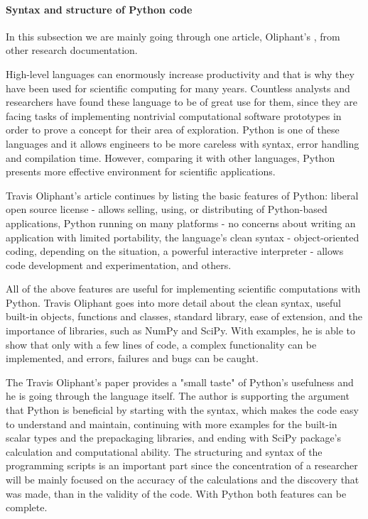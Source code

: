 \paragraph{Syntax and structure of Python code} 
\label{syntax}

In this subsection we are mainly going through one article, Oliphant's \cite{oliphant2007python}, from other research documentation. 

High-level languages can enormously increase productivity and that is why they have been used for scientific computing for many years. Countless analysts and researchers have found these language to be of great use for them, since they are facing tasks of implementing nontrivial computational software prototypes in order to prove a concept for their area of exploration. Python is one of these languages and it allows engineers to be more careless with syntax, error handling and compilation time. However, comparing it with other languages, Python presents more effective environment for scientific applications.

Travis Oliphant's article continues by listing the basic features of Python: liberal open source license - allows selling, using, or
distributing of Python-based applications, Python running on many platforms - no concerns about writing an application with limited portability, the language’s clean syntax - object-oriented coding, depending on the situation, a powerful interactive interpreter - allows code development and experimentation, and others.\cite{oliphant2007python}

All of the above features are useful for implementing scientific computations with Python. Travis Oliphant goes into more detail about the clean syntax, useful built-in objects, functions and classes, standard library, ease of extension, and the importance of libraries, such as NumPy and SciPy. With examples, he is able to show that only with a few lines of code, a complex functionality can be implemented, and errors, failures and bugs can be caught. 

The Travis Oliphant's paper\cite{oliphant2007python} provides a "small taste" of Python’s usefulness and he is going through the language itself. The author is supporting the argument that Python is beneficial by starting with the syntax, which makes the code easy to understand and maintain, continuing with more examples for the built-in scalar types and the prepackaging libraries, and ending with SciPy package's calculation and computational ability. The structuring and syntax of the programming scripts is an important part since the concentration of a researcher will be mainly focused on the accuracy of the calculations and the discovery that was made, than in the validity of the code. With Python both features can be complete. 

